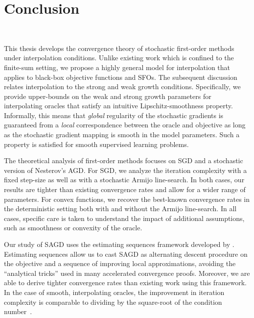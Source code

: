 \acresetall 
\chapter{Conclusion}~\label{ch:conclusion}

This thesis develops the convergence theory of stochastic first-order methods under interpolation conditions. 
Unlike existing work which is confined to the finite-sum setting, we propose a highly general model for interpolation that applies to black-box objective functions and \acp{SFO}. 
The subsequent discussion relates interpolation to the strong and weak growth conditions.
Specifically, we provide upper-bounds on the weak and strong growth parameters for interpolating oracles that satisfy an intuitive Lipschitz-smoothness property. 
Informally, this means that \emph{global} regularity of the stochastic gradients is guaranteed from a \emph{local} correspondence between the oracle and objective as long as the stochastic gradient mapping is smooth in the model parameters. 
Such a property is satisfied for smooth supervised learning problems. 

The theoretical analysis of first-order methods focuses on \ac{SGD} and a stochastic version of Nesterov's \acl{AGD}. 
For \ac{SGD}, we analyze the iteration complexity with a fixed step-size as well as with a stochastic Armijo line-search.
In both cases, our results are tighter than existing convergence rates and allow for a wider range of parameters.
For convex functions, we recover the best-known convergence rates in the deterministic setting both with and without the Armijo line-search.
In all cases, specific care is taken to understand the impact of additional assumptions, such as smoothness or convexity of the oracle.

Our study of \ac{SAGD} uses the estimating sequences framework developed by \citet{nesterov2004lectures}.
Estimating sequences allow us to cast \ac{SAGD} as alternating descent procedure on the objective and a sequence of improving local approximations, avoiding the ``analytical tricks'' used in many accelerated convergence proofs. 
Moreover, we are able to derive tighter convergence rates than existing work using this framework. 
In the case of smooth, interpolating oracles, the improvement in iteration complexity is comparable to dividing by the square-root of the condition number~\citep{vaswani2019fast}.

